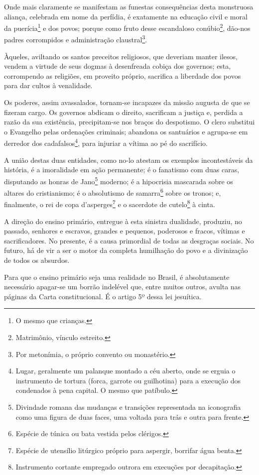 Onde mais claramente se manifestam as funestas consequências desta
monstruosa aliança, celebrada em nome da perfídia, é exatamente na
educação civil e moral da puerícia\footnote{O mesmo que crianças.} e
dos povos; porque como fruto desse escandaloso conúbio\footnote{
  Matrimônio, vínculo estreito.}, dão-nos padres corrompidos e
administração claustral\footnote{Por metonímia, o próprio convento ou
  monastério.}.

Àqueles, aviltando os santos preceitos religiosos, que deveriam manter
ilesos, vendem a virtude de seus dogmas à desenfreada cobiça dos
governos; esta, corrompendo as religiões, em proveito próprio, sacrifica
a liberdade dos povos para dar cultos à venalidade.

Os poderes, assim avassalados, tornam-se incapazes da missão augusta de
que se fizeram cargo. Os governos abdicam o direito, sacrificam a
justiça e, perdida a razão da sua existência, precipitam-se nos braços
do despotismo. O clero substitui o Evangelho pelas ordenações criminais;
abandona os santuários e agrupa-se em derredor dos
cadafalsos\footnote{Lugar, geralmente um palanque montado a céu
  aberto, onde se erguia o instrumento de tortura (forca, garrote ou
  guilhotina) para a execução dos condenados à pena capital. O mesmo que
  patíbulo.}, para injuriar a vítima ao pé do sacrifício.

A união destas duas entidades, como no-lo atestam os exemplos
incontestáveis da história, é a imoralidade em ação permanente; é o
fanatismo com duas caras, disputando as honras de Jano\footnote{
  Divindade romana das mudanças e transições representada na iconografia
  como uma figura de duas faces, uma voltada para trás e outra para
  frente.} moderno; é a hipocrisia mascarada sobre os altares do
cristianismo; é o absolutismo de samarra\footnote{Espécie de túnica ou
  bata vestida pelos clérigos.} sobre os tronos; e, finalmente, o rei de
copa d'asperges\footnote{Espécie de utensílio litúrgico próprio para
  aspergir, borrifar água benta.} e o sacerdote de cutelo\footnote{
  Instrumento cortante empregado outrora em execuções por decapitação.}
à cinta.

A direção do ensino primário, entregue à esta sinistra dualidade,
produziu, no passado, senhores e escravos, grandes e pequenos, poderosos
e fracos, vítimas e sacrificadores. No presente, é a causa primordial de
todas as desgraças sociais. No futuro, há de vir a ser o motor da
completa humilhação do povo e a divinização de todos os absurdos.

Para que o ensino primário seja uma realidade no Brasil, é absolutamente
necessário apagar-se um borrão indelével que, entre muitos outros,
avulta nas páginas da Carta constitucional. É o artigo 5º dessa lei
jesuítica.

